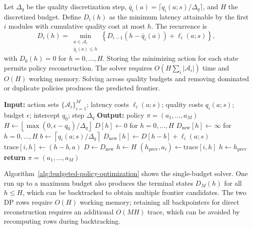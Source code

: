 \documentclass[letterpaper]{article} %
\numberwithin{equation}{section}
\numberwithin{table}{section}
\begin{document}
Let \(\Delta_q\) be the quality discretization step,
\(\bar q_i(a)=\lceil q_i(a;s)/\Delta_q\rceil\), and \(H\) the discretized
budget. Define \(D_i(h)\) as the minimum latency attainable by the first
\(i\) modules with cumulative quality cost at most \(h\). The recurrence is
\begin{equation}
D_i(h)
=
\min_{\substack{a\in\mathcal{A}_i\\\bar q_i(a)\leq h}}
\left\{
D_{i-1}\!\left(h-\bar q_i(a)\right)+\ell_i(a;s)
\right\},
\end{equation}
with \(D_0(h)=0\) for \(h=0,\ldots,H\). Storing the minimizing action for
each state permits policy reconstruction. The solver requires
\(O\!\left(H\sum_i|\mathcal{A}_i|\right)\) time and \(O(H)\) working memory.
Solving across quality budgets and removing dominated or duplicate policies
produces the predicted frontier.

\begin{algorithm}[t]
\caption{Quality-budgeted policy optimization}
\label{alg:budgeted-policy-optimization}
\small
\begin{algorithmic}[1]
\STATE \textbf{Input:} action sets \(\{\mathcal{A}_i\}_{i=1}^{M}\);
latency costs \(\ell_i(a;s)\); quality costs \(q_i(a;s)\);
budget \(\epsilon\); intercept \(q_0\); step \(\Delta_q\)
\STATE \textbf{Output:} policy \(\pi=(a_1,\ldots,a_M)\)
\STATE \(H\gets
\left\lfloor\max(0,\epsilon-q_0)/\Delta_q\right\rfloor\)
\STATE \(D[h]\gets0\) for \(h=0,\ldots,H\)
    \STATE \(D_{\mathrm{new}}[h]\gets\infty\) for \(h=0,\ldots,H\)
            \STATE \(b\gets\left\lceil q_i(a;s)/\Delta_q\right\rceil\)
                \STATE \(D_{\mathrm{new}}[h]\gets
                    D[h-b]+\ell_i(a;s)\)
                \STATE \(\mathrm{trace}[i,h]\gets(h-b,a)\)
            \ENDIF
        \ENDFOR
    \ENDFOR
    \STATE \(D\gets D_{\mathrm{new}}\)
\ENDFOR
\STATE \(h\gets H\)
    \STATE \((h_{\mathrm{prev}},a_i)\gets\mathrm{trace}[i,h]\)
    \STATE \(h\gets h_{\mathrm{prev}}\)
\ENDFOR
\STATE \textbf{return} \(\pi=(a_1,\ldots,a_M)\)
\end{algorithmic}
\end{algorithm}

Algorithm~\ref{alg:budgeted-policy-optimization} shows the single-budget
solver. One run up to a maximum budget also produces the terminal states
\(D_M(h)\) for all \(h\leq H\), which can be backtracked to obtain multiple
frontier candidates. The two DP rows require \(O(H)\) working memory; retaining
all backpointers for direct reconstruction requires an additional \(O(MH)\)
trace, which can be avoided by recomputing rows during backtracking.
\end{document}
